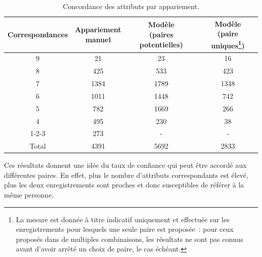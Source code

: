 \documentclass[a4paper,12pt,twoside]{book}
\begin{document}
                \begin{savenotes} %
                \begin{table}[htbp]
    	            \centering
                    \renewcommand\cellalign{cl}
    			        \begin{tabular}{|c|c|c|c|}
    			        \hline
			            Correspondances&\Centerstack{Appariement\\manuel}&\Centerstack{Modèle\\(paires potentielles)}&\Centerstack{Modèle\\(paire uniques\footnote{La mesure est donnée à titre indicatif uniquement et effectuée sur les enregistrements pour lesquels une seule paire est proposée~: pour ceux proposés dans de multiples combinaisons, les résultats ne sont pas connus avant d'avoir arrêté un choix de paire, le cas échéant.})}\\\hline
                        9&21&23&16\\
                        8&425&533&423\\
                        7&1384&1789&1348\\
                        6&1011&1448&742\\
                        5&782&1669&266\\
                        4&495&230&38\\
                        1-2-3&273&-&-\\\hline
                        Total&4391&5692&2833\\\hline
                    \end{tabular}
                \caption{Concordance des attributs par appariement.}\label{tab15}
			    \end{table}   
                \end{savenotes}
                
                Ces résultats donnent une idée du taux de confiance qui peut être accordé aux différentes paires. En effet, plus le nombre d'attributs correspondants est élevé, plus les deux enregistrements sont proches et donc susceptibles de référer à la même personne.
                \pagebreak                
\end{document}
